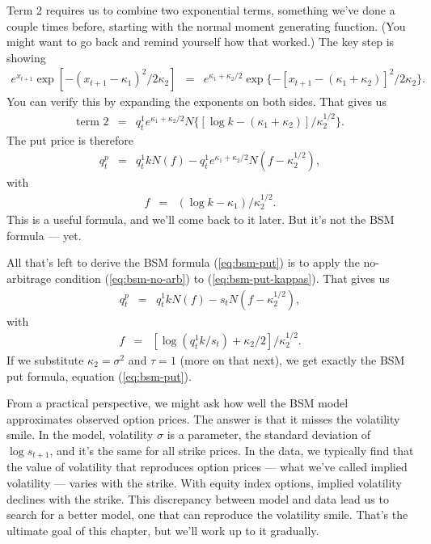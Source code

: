 \documentclass[11pt]{article}
\begin{document}
Term 2 requires us to combine two exponential terms, something
we've done a couple times before, starting with the normal
moment generating function.
(You might want to go back and remind yourself how that worked.)
The key step is showing
\begin{eqnarray*}
    e^{x_{t+1}} \exp[ - (x_{t+1} - \kappa_1)^2/2\kappa_2] &=&
        e^{\kappa_1 + \kappa_2/2} \exp\{ - [x_{t+1} - (\kappa_1+\kappa_2)]^2/2\kappa_2 \} .
\end{eqnarray*}
You can verify this by expanding the exponents on both sides.
That gives us
\begin{eqnarray*}
    \mbox{term 2} &=& q^1_t e^{\kappa_1 + \kappa_2/2}
            N \{ [\log k - (\kappa_1 + \kappa_2)]/\kappa_2^{1/2} \} .
\end{eqnarray*}
The put price is therefore
\begin{eqnarray}
    q^p_t &=& q^1_t k N (f) - q^1_t e^{\kappa_1 + \kappa_2/2}
            N ( f - \kappa_2^{1/2} ),
    \label{eq:bsm-put-kappas}
\end{eqnarray}
with
\begin{eqnarray*}
    f &=&  (\log k - \kappa_1)/\kappa_2^{1/2} .
\end{eqnarray*}
This is a useful formula, and we'll come back to it later.
But it's not the BSM formula --- yet.

All that's left to derive the BSM formula (\ref{eq:bsm-put})
is to apply the no-arbitrage condition (\ref{eq:bsm-no-arb})
to (\ref{eq:bsm-put-kappas}).
That gives us
\begin{eqnarray}
    q^p_t &=& q^1_t k N (f) - s_t N ( f - \kappa_2^{1/2} ),
    \label{eq:bsm-put-kappas-bsm}
\end{eqnarray}
with
\begin{eqnarray*}
    f &=&  [\log (q^1_t k/s_t) + \kappa_2/2]/\kappa_2^{1/2} .
\end{eqnarray*}
If we substitute $\kappa_2 = \sigma^2$ and $\tau = 1$ (more on that next),
we get exactly the BSM put formula, equation (\ref{eq:bsm-put}).

From a practical perspective, we might ask how well the BSM model
approximates observed option prices.
The answer is that it misses the volatility smile.
In the model, volatility $\sigma$ is a parameter,
the standard deviation of $\log s_{t+1}$,
and  it's the same for all strike prices.
In the data, we typically find that the value of volatility that reproduces
option prices --- what we've called implied volatility ---
varies with the strike.
With equity index options, implied volatility declines with the strike.
This discrepancy between model and data lead us to search
for a better model, one that can reproduce the volatility smile.
That's the ultimate goal of this chapter,
but we'll work up to it gradually.
\end{document}
